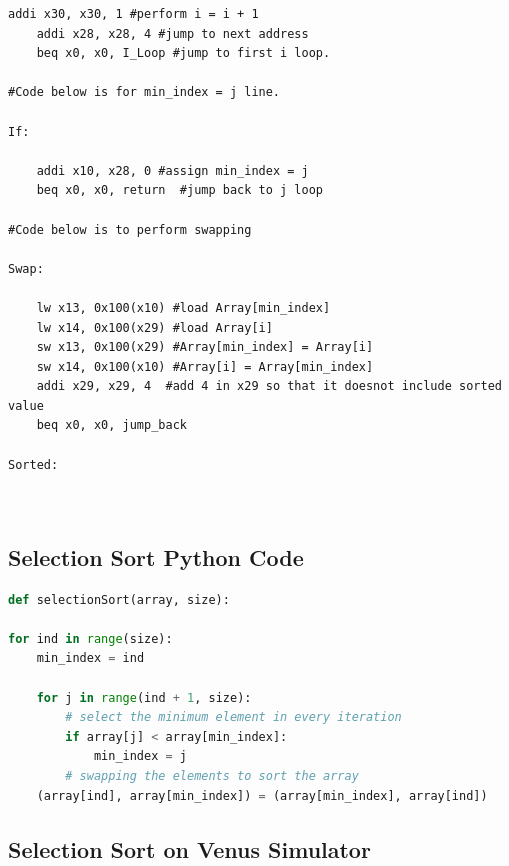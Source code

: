 \documentclass{article}
\begin{document}
\begin{lstlisting}[caption={Selection Sort Assembly code}, captionpos=b, language=RISC-V]
    addi x30, x30, 1 #perform i = i + 1
    addi x28, x28, 4 #jump to next address
    beq x0, x0, I_Loop #jump to first i loop.
    
#Code below is for min_index = j line.

If:

    addi x10, x28, 0 #assign min_index = j
    beq x0, x0, return  #jump back to j loop

#Code below is to perform swapping

Swap:

    lw x13, 0x100(x10) #load Array[min_index]
    lw x14, 0x100(x29) #load Array[i] 
    sw x13, 0x100(x29) #Array[min_index] = Array[i]
    sw x14, 0x100(x10) #Array[i] = Array[min_index]
    addi x29, x29, 4  #add 4 in x29 so that it doesnot include sorted value
    beq x0, x0, jump_back

Sorted:
    
    
\end{lstlisting}

\subsection{Selection Sort Python Code}

\begin{lstlisting}[caption={Selection Sort Python Code (Taken from GeeksforGeeks)}, captionpos=b, language=Python]
def selectionSort(array, size):

for ind in range(size):
    min_index = ind

    for j in range(ind + 1, size):
        # select the minimum element in every iteration
        if array[j] < array[min_index]:
            min_index = j
        # swapping the elements to sort the array
    (array[ind], array[min_index]) = (array[min_index], array[ind])    
\end{lstlisting}

\newpage

\subsection{Selection Sort on Venus Simulator}
\end{document}
